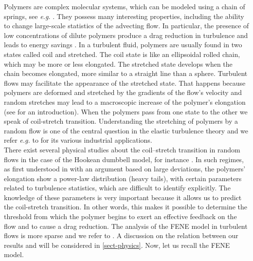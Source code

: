 \documentclass[a4paper,12pt, reqno]{amsart}
\begin{document}
Polymers are complex molecular systems,  which can be modeled using a chain of springs, see \textit{e.g.}  \cite{BriTL09}. They possess many interesting properties, including the ability to change large-scale statistics of the advecting flow. In particular,  the presence of low concentrations of dilute polymers produce  a drag reduction in turbulence and  leads to energy savings \cite{Gyr1995drag}.
 In a turbulent fluid, polymers are usually found in two states called coil and stretched. The coil state is like an  ellipsoidal rolled chain, which may be more or less elongated. The stretched state develops when the chain becomes elongated, more similar to a straight line than a sphere. Turbulent flows may facilitate the appearance of the stretched state. That happens because polymers are deformed and stretched by the gradients of the flow's velocity  and random stretches may lead to a macroscopic increase of the polymer's elongation (see \cite{FalGawVer} for an introduction). When the polymers pass from one state to the other we speak of coil-stretch transition. Understanding the stretching of polymers  by a random flow is  one of the 
 central question in the elastic turbulence theory and we refer \textit{e.g.} to  \cite{Steinberg2021elastic}  for its various industrial applications.\\

There exist several  physical studies about the coil–stretch transition in random flows in the case of the Hookean dumbbell model, for instance \cite{Balk,Celani2005polymer,Chertkov}. In such regimes, as first understood in \cite{Balk} with an argument based on large deviations, the polymers' elongation show a power-law distribution (heavy tails), with certain parameters related to turbulence statistics, which are difficult to identify explicitly. The knowledge of these parameters is very important because it allows us to predict the coil-stretch transition. In other words, this makes it possible to determine the threshold from which the polymer begins to exert an effective feedback on the flow and to cause a drag reduction.
The analysis of the FENE model in turbulent flows is more sparse and we refer to \cite{PicardoLanceVinc, Afonso2005nonlinear}. A discussion on the relation between our results and \cite{Afonso2005nonlinear}  will be considered in \autoref{sect-physics}.
Now, let us recall the FENE model.
\end{document}
